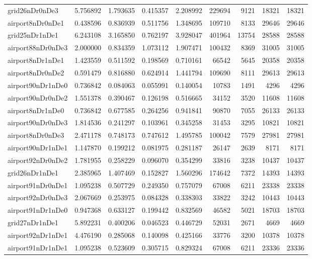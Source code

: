 \begin{longtable}{|l|r|r|r|r|r|r|r|r|}
grid26nDr0nDe3 & 5.756892 & 1.793635 & 0.415357 & 2.208992 & 229694 & 9121 & 18321 & 18321 \\
airport8nDr0nDe1 & 0.438596 & 0.836939 & 0.511756 & 1.348695 & 109710 & 8133 & 29646 & 29646 \\
grid25nDr1nDe1 & 6.243108 & 3.165850 & 0.762197 & 3.928047 & 401964 & 13754 & 28588 & 28588 \\
airport88nDr0nDe3 & 2.000000 & 0.834359 & 1.073112 & 1.907471 & 100432 & 8369 & 31005 & 31005 \\
airport8nDr1nDe1 & 1.423559 & 0.511592 & 0.198569 & 0.710161 & 66542 & 5645 & 20358 & 20358 \\
airport8nDr0nDe2 & 0.591479 & 0.816880 & 0.624914 & 1.441794 & 109690 & 8111 & 29613 & 29613 \\
airport90nDr1nDe0 & 0.736842 & 0.084063 & 0.055991 & 0.140054 & 10783 & 1491 & 4296 & 4296 \\
airport90nDr0nDe2 & 1.551378 & 0.390467 & 0.126198 & 0.516665 & 34152 & 3520 & 11608 & 11608 \\
airport8nDr1nDe0 & 0.736842 & 0.677585 & 0.264256 & 0.941841 & 90870 & 7055 & 26133 & 26133 \\
airport90nDr0nDe3 & 1.814536 & 0.241297 & 0.103961 & 0.345258 & 31453 & 3295 & 10821 & 10821 \\
airport8nDr0nDe3 & 2.471178 & 0.748173 & 0.747612 & 1.495785 & 100042 & 7579 & 27981 & 27981 \\
airport90nDr1nDe1 & 1.147870 & 0.199212 & 0.081975 & 0.281187 & 26147 & 2639 & 8171 & 8171 \\
airport92nDr0nDe2 & 1.781955 & 0.258229 & 0.096070 & 0.354299 & 33816 & 3238 & 10437 & 10437 \\
grid26nDr1nDe1 & 2.385965 & 1.407469 & 0.152827 & 1.560296 & 174642 & 7372 & 14393 & 14393 \\
airport91nDr0nDe1 & 1.095238 & 0.507729 & 0.249350 & 0.757079 & 67008 & 6211 & 23338 & 23338 \\
airport92nDr0nDe3 & 2.067669 & 0.253975 & 0.084328 & 0.338303 & 33822 & 3242 & 10443 & 10443 \\
airport91nDr1nDe0 & 0.947368 & 0.633127 & 0.199442 & 0.832569 & 46582 & 5021 & 18703 & 18703 \\
grid27nDr1nDe1 & 5.892231 & 0.400206 & 0.046523 & 0.446729 & 52031 & 2671 & 4669 & 4669 \\
airport92nDr1nDe1 & 4.476190 & 0.285068 & 0.140098 & 0.425166 & 33776 & 3200 & 10378 & 10378 \\
airport91nDr1nDe1 & 1.095238 & 0.523609 & 0.305715 & 0.829324 & 67008 & 6211 & 23336 & 23336 \\

\end{longtable}
